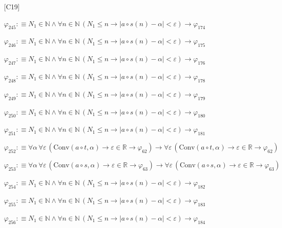 \begin{fullproof}{[C19]}
\begin{abbrevlist}
\item $\varphi_{245} :\equiv N_{1} \in \mathbb{N} \land \forall n \in \mathbb{N}\,(N_{1} \leq n \to \lvert a \circ s(n) - \alpha \rvert < \varepsilon) \to \varphi_{174}$
\item $\varphi_{246} :\equiv N_{1} \in \mathbb{N} \land \forall n \in \mathbb{N}\,(N_{1} \leq n \to \lvert a \circ s(n) - \alpha \rvert < \varepsilon) \to \varphi_{175}$
\item $\varphi_{247} :\equiv N_{1} \in \mathbb{N} \land \forall n \in \mathbb{N}\,(N_{1} \leq n \to \lvert a \circ s(n) - \alpha \rvert < \varepsilon) \to \varphi_{176}$
\item $\varphi_{248} :\equiv N_{1} \in \mathbb{N} \land \forall n \in \mathbb{N}\,(N_{1} \leq n \to \lvert a \circ s(n) - \alpha \rvert < \varepsilon) \to \varphi_{178}$
\item $\varphi_{249} :\equiv N_{1} \in \mathbb{N} \land \forall n \in \mathbb{N}\,(N_{1} \leq n \to \lvert a \circ s(n) - \alpha \rvert < \varepsilon) \to \varphi_{179}$
\item $\varphi_{250} :\equiv N_{1} \in \mathbb{N} \land \forall n \in \mathbb{N}\,(N_{1} \leq n \to \lvert a \circ s(n) - \alpha \rvert < \varepsilon) \to \varphi_{180}$
\item $\varphi_{251} :\equiv N_{1} \in \mathbb{N} \land \forall n \in \mathbb{N}\,(N_{1} \leq n \to \lvert a \circ s(n) - \alpha \rvert < \varepsilon) \to \varphi_{181}$
\item $\varphi_{252} :\equiv \forall \alpha\,\forall \varepsilon\,(\mathrm{Conv}(a \circ t,\alpha) \to \varepsilon \in \mathbb{R} \to \varphi_{62}) \to \forall \varepsilon\,(\mathrm{Conv}(a \circ t,\alpha) \to \varepsilon \in \mathbb{R} \to \varphi_{62})$
\item $\varphi_{253} :\equiv \forall \alpha\,\forall \varepsilon\,(\mathrm{Conv}(a \circ s,\alpha) \to \varepsilon \in \mathbb{R} \to \varphi_{63}) \to \forall \varepsilon\,(\mathrm{Conv}(a \circ s,\alpha) \to \varepsilon \in \mathbb{R} \to \varphi_{63})$
\item $\varphi_{254} :\equiv N_{1} \in \mathbb{N} \land \forall n \in \mathbb{N}\,(N_{1} \leq n \to \lvert a \circ s(n) - \alpha \rvert < \varepsilon) \to \varphi_{182}$
\item $\varphi_{255} :\equiv N_{1} \in \mathbb{N} \land \forall n \in \mathbb{N}\,(N_{1} \leq n \to \lvert a \circ s(n) - \alpha \rvert < \varepsilon) \to \varphi_{183}$
\item $\varphi_{256} :\equiv N_{1} \in \mathbb{N} \land \forall n \in \mathbb{N}\,(N_{1} \leq n \to \lvert a \circ s(n) - \alpha \rvert < \varepsilon) \to \varphi_{184}$

\end{abbrevlist}
\end{fullproof}
